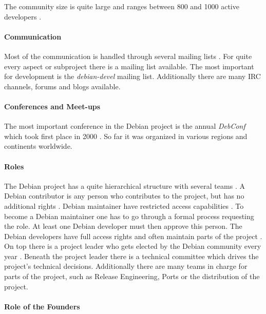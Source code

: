 The community size is quite large and ranges between 800 and 1000 active
developers \cite{Perrier2011,DebianOrg}.

\paragraph{Communication}

Most of the communication is handled through several mailing lists
\cite{DebianMailingLists,DebianFAQ,DebianNewMembers}. For quite every aspect or
subproject there is a mailing list available. The most important for
development is the \emph{debian-devel} mailing list. Additionally there are
many \ac{IRC} channels, forums and blogs available.

\paragraph{Conferences and Meet-ups}

The most important conference in the Debian project is the annual
\emph{DebConf} which took first place in 2000 \cite{DebianDebConf}. So far it
was organized in various regions and continents worldwide.

\paragraph{Roles}

The Debian project has a quite hierarchical structure with several teams
\cite{DebianOrg,Sadowski2008}. A Debian contributor is any person who
contributes to the project, but has no additional rights \cite{DebianFAQ}.
Debian maintainer have restricted access capabilities \cite{DebianMaintainer}.
To become a Debian maintainer one has to go through a formal process requesting
the role. At least one Debian developer must then approve this person. The
Debian developers have full access rights and often maintain parts of the
project \cite{DebianDev}. On top there is a project leader who gets elected by
the Debian community every year \cite{DebianOrg,DebianVoting}. Beneath the
project leader there is a technical committee which drives the project's
technical decisions. Additionally there are many teams in charge for parts of
the project, such as Release Engineering, Ports or the distribution of the
project.

\paragraph{Role of the Founders}

